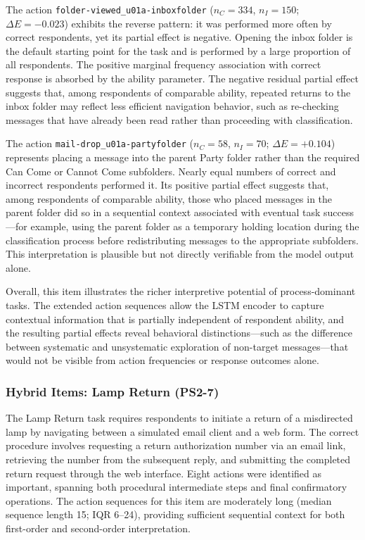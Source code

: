 \documentclass[A4paper,11pt]{article}
\begin{document}
The action \texttt{folder-viewed\_u01a-inboxfolder} ($n_C = 334$, $n_I = 150$; $\Delta E = -0.023$) exhibits the reverse pattern: it was performed more often by correct respondents, yet its partial effect is negative. Opening the inbox folder is the default starting point for the task and is performed by a large proportion of all respondents. The positive marginal frequency association with correct response is absorbed by the ability parameter. The negative residual partial effect suggests that, among respondents of comparable ability, repeated returns to the inbox folder may reflect less efficient navigation behavior, such as re-checking messages that have already been read rather than proceeding with classification.

The action \texttt{mail-drop\_u01a-partyfolder} ($n_C = 58$, $n_I = 70$; $\Delta E = +0.104$) represents placing a message into the parent Party folder rather than the required Can Come or Cannot Come subfolders. Nearly equal numbers of correct and incorrect respondents performed it. Its positive partial effect suggests that, among respondents of comparable ability, those who placed messages in the parent folder did so in a sequential context associated with eventual task success---for example, using the parent folder as a temporary holding location during the classification process before redistributing messages to the appropriate subfolders. This interpretation is plausible but not directly verifiable from the model output alone.

Overall, this item illustrates the richer interpretive potential of process-dominant tasks. The extended action sequences allow the LSTM encoder to capture contextual information that is partially independent of respondent ability, and the resulting partial effects reveal behavioral distinctions---such as the difference between systematic and unsystematic exploration of non-target messages---that would not be visible from action frequencies or response outcomes alone.

\subsubsection{Hybrid Items: Lamp Return (PS2-7)}

The Lamp Return task requires respondents to initiate a return of a misdirected lamp by navigating between a simulated email client and a web form. The correct procedure involves requesting a return authorization number via an email link, retrieving the number from the subsequent reply, and submitting the completed return request through the web interface. Eight actions were identified as important, spanning both procedural intermediate steps and final confirmatory operations. The action sequences for this item are moderately long (median sequence length 15; IQR 6--24), providing sufficient sequential context for both first-order and second-order interpretation.
\end{document}
